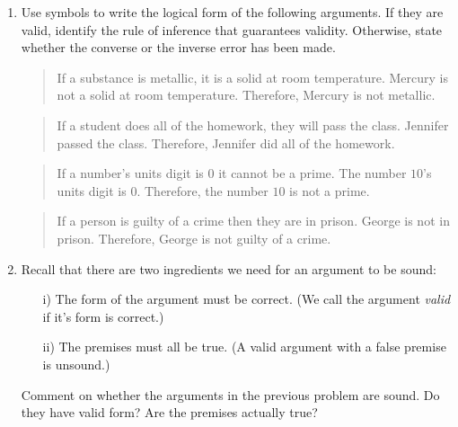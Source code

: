 \documentclass{amsart}
\begin{document}
\begin{enumerate}
\newpage

\item Use symbols to write the logical form of the following arguments.
  If they are valid, identify the rule of inference that guarantees
  validity. Otherwise, state whether the converse or the inverse error
  has been made. 

\begin{quote}
 If a substance is metallic, it is a solid at room temperature. \newline
 Mercury is not a solid at room temperature. \newline
 Therefore, Mercury is not metallic.
\end{quote}

\vfill


\begin{quote}
 If a student does all of the homework, they will pass the class.\newline
 Jennifer passed the class.\newline
 Therefore, Jennifer did all of the homework.
\end{quote}

\vfill

\begin{quote}
  If a number's units digit is $0$ it cannot be a prime.\newline
  The number $10$'s units digit is $0$. \newline
  Therefore, the number $10$ is not a prime. \newline
\end{quote}

\vfill

\begin{quote}
  If a person is guilty of a crime then they are in prison. \newline 
  George is not in prison. \newline 
  Therefore, George is not guilty of a crime. 
\end{quote}

\vfill


\newpage

\item Recall that there are two ingredients we need for an argument to be sound:
\begin{enumerate}
\item[i)] The form of the argument must be correct. (We call the argument {\em valid} if it's form is correct.)
\item[ii)] The premises must all be true.  (A valid argument with a false premise is unsound.) 
\end{enumerate}

Comment on whether the arguments in the previous problem are sound.  Do they have valid form?  Are the premises actually true?

\end{enumerate}
\end{document}
